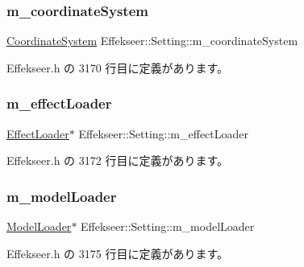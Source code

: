 \subsubsection{\texorpdfstring{m\+\_\+coordinate\+System}{m\_coordinateSystem}}
{\footnotesize\ttfamily \mbox{\hyperlink{namespace_effekseer_ac8508f8823c5fcf36aac5d2ddee23765}{Coordinate\+System}} Effekseer\+::\+Setting\+::m\+\_\+coordinate\+System\hspace{0.3cm}{\ttfamily [private]}}



 Effekseer.\+h の 3170 行目に定義があります。

\mbox{\label{class_effekseer_1_1_setting_aa72aea5933efe362ecf28210ea202350}} 
\subsubsection{\texorpdfstring{m\+\_\+effect\+Loader}{m\_effectLoader}}
{\footnotesize\ttfamily \mbox{\hyperlink{class_effekseer_1_1_effect_loader}{Effect\+Loader}}$\ast$ Effekseer\+::\+Setting\+::m\+\_\+effect\+Loader\hspace{0.3cm}{\ttfamily [private]}}



 Effekseer.\+h の 3172 行目に定義があります。

\mbox{\label{class_effekseer_1_1_setting_a85340df413c521f9372f617512bc58d8}} 
\subsubsection{\texorpdfstring{m\+\_\+model\+Loader}{m\_modelLoader}}
{\footnotesize\ttfamily \mbox{\hyperlink{class_effekseer_1_1_model_loader}{Model\+Loader}}$\ast$ Effekseer\+::\+Setting\+::m\+\_\+model\+Loader\hspace{0.3cm}{\ttfamily [private]}}



 Effekseer.\+h の 3175 行目に定義があります。

